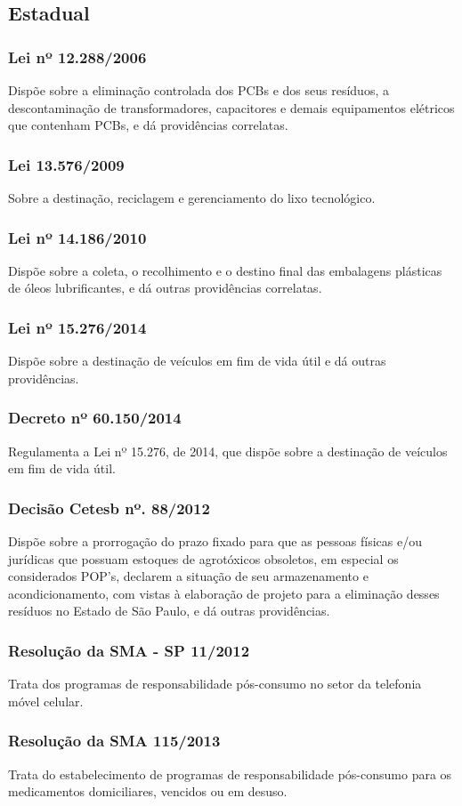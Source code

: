 \begin{subapend}
	\subsection{Estadual}
	\begin{subsubapend}
		\subsubsection{Lei nº 12.288/2006}
		Dispõe sobre a eliminação controlada dos PCBs e dos seus resíduos, a descontaminação de transformadores, capacitores e demais equipamentos elétricos que contenham PCBs, e dá providências correlatas.
		\subsubsection{Lei 13.576/2009}
		Sobre a destinação, reciclagem e gerenciamento do lixo tecnológico.
		\subsubsection{Lei nº 14.186/2010}
		Dispõe sobre a coleta, o recolhimento e o destino final das embalagens plásticas de óleos lubrificantes, e dá outras providências correlatas.
		\subsubsection{Lei nº 15.276/2014}
		Dispõe sobre a destinação de veículos em fim de vida útil e dá outras providências.
		\subsubsection{Decreto nº 60.150/2014}
		Regulamenta a Lei nº 15.276, de 2014, que dispõe sobre a destinação de veículos em fim de vida útil.
		\subsubsection{Decisão Cetesb nº. 88/2012}
		Dispõe sobre a prorrogação do prazo fixado para que as pessoas físicas e/ou jurídicas que possuam estoques de agrotóxicos obsoletos, em especial os considerados POP's, declarem a situação de seu armazenamento e acondicionamento, com vistas à elaboração de projeto para a eliminação desses resíduos no Estado de São Paulo, e dá outras providências.
		\subsubsection{Resolução da SMA - SP 11/2012}
		Trata dos programas de responsabilidade pós-consumo no setor da telefonia móvel celular.
		\subsubsection{Resolução da SMA 115/2013}
		Trata do estabelecimento de programas de responsabilidade pós-consumo para os medicamentos domiciliares, vencidos ou em desuso.
	\end{subsubapend}
\end{subapend}	


